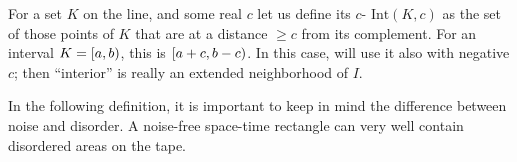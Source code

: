 \documentclass[11pt]{memoir}
\theoremstyle{definition} %
\renewcommand{\ge}{\geq}
\newcommand{\Int}{\mathrm{Int}} %
\begin{document}

 \begin{definition}\label{def:interior}
  For a set \( K \) on the line,  and some real \( c \) let us define its \( c \)-
  \(  \Int(K,c) \) as the set of those points of \( K \) that are at a distance \( \ge c \) from
  its complement.
  For an interval \( K = \left[a,b\right) \), this is \( \left[a+c,b-c\right) \).
  In this case, will use it also  with negative \( c \); then ``interior'' is really an extended
  neighborhood of \( I \).
 \end{definition}

  In the following definition, it is important to keep in mind the difference between noise and disorder.
  A noise-free space-time rectangle can very well contain disordered areas on the tape.
  
\end{document}
